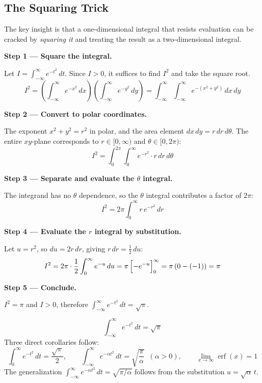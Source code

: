 \documentclass[11pt]{article}
\begin{document}
\subsection{The Squaring Trick}

The key insight is that a one-dimensional integral that resists evaluation can be cracked by \textit{squaring it} and treating the result as a two-dimensional integral.

\begin{methodbox}[Method: Polar Coordinate Proof of $\int_{-\infty}^{\infty} e^{-t^2}\,dt = \sqrt{\pi}$]

\textbf{Step 1 --- Square the integral.}

Let $I = \int_{-\infty}^{\infty} e^{-t^2}\,dt$. Since $I > 0$, it suffices to find $I^2$ and take the square root.
\[
I^2 = \left(\int_{-\infty}^{\infty} e^{-x^2}\,dx\right)\!\left(\int_{-\infty}^{\infty} e^{-y^2}\,dy\right) = \int_{-\infty}^{\infty}\!\int_{-\infty}^{\infty} e^{-(x^2+y^2)}\,dx\,dy
\]

\textbf{Step 2 --- Convert to polar coordinates.}

The exponent $x^2 + y^2 = r^2$ in polar, and the area element $dx\,dy = r\,dr\,d\theta$. The entire $xy$-plane corresponds to $r \in [0,\infty)$ and $\theta \in [0, 2\pi)$:
\[
I^2 = \int_{0}^{2\pi}\!\int_{0}^{\infty} e^{-r^2}\cdot r\,dr\,d\theta
\]

\textbf{Step 3 --- Separate and evaluate the $\theta$ integral.}

The integrand has no $\theta$ dependence, so the $\theta$ integral contributes a factor of $2\pi$:
\[
I^2 = 2\pi \int_{0}^{\infty} r\,e^{-r^2}\,dr
\]

\textbf{Step 4 --- Evaluate the $r$ integral by substitution.}

Let $u = r^2$, so $du = 2r\,dr$, giving $r\,dr = \frac{1}{2}\,du$:
\[
I^2 = 2\pi \cdot \frac{1}{2}\int_{0}^{\infty} e^{-u}\,du = \pi\,\Bigl[-e^{-u}\Bigr]_{0}^{\infty} = \pi\,(0 - (-1)) = \pi
\]

\textbf{Step 5 --- Conclude.}

$I^2 = \pi$ and $I > 0$, therefore $\displaystyle\int_{-\infty}^{\infty} e^{-t^2}\,dt = \sqrt{\pi}$.
\end{methodbox}

\begin{theorembox}
\[
\int_{-\infty}^{\infty} e^{-t^2}\,dt = \sqrt{\pi}
\]
Three direct corollaries follow:
\[
\int_{0}^{\infty} e^{-t^2}\,dt = \frac{\sqrt{\pi}}{2}, \qquad
\int_{-\infty}^{\infty} e^{-\alpha t^2}\,dt = \sqrt{\frac{\pi}{\alpha}}\;\;(\alpha > 0), \qquad
\lim_{x\to\infty}\operatorname{erf}(x) = 1
\]
The generalization $\int_{-\infty}^{\infty} e^{-\alpha t^2}\,dt = \sqrt{\pi/\alpha}$ follows from the substitution $u = \sqrt{\alpha}\,t$.
\end{theorembox}
\end{document}
